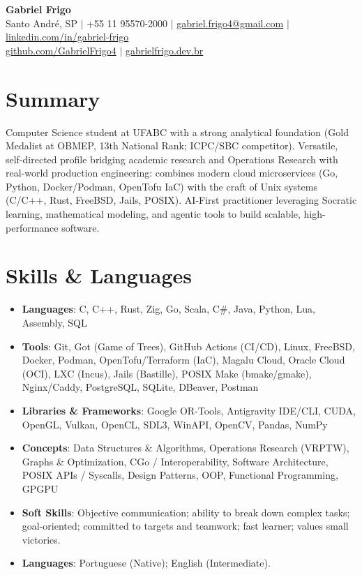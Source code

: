 \documentclass[letterpaper,10pt]{article}
\newcommand{\resumeItem}[1]{\item\small{#1}}
\newcommand{\resumeSubHeadingList}{\begin{itemize}[leftmargin=0.15in, label={}]}
\newcommand{\resumeSubHeadingListEnd}{\end{itemize}}
\begin{document}
\begin{center}
  \textbf{\Huge Gabriel Frigo} \\
  \small Santo André, SP $|$ +55 11 95570-2000 $|$ \href{mailto:gabriel.frigo4@gmail.com}{gabriel.frigo4@gmail.com} $|$
  \href{https://linkedin.com/in/gabriel-frigo-b6727b275/}{linkedin.com/in/gabriel-frigo} \\
  \href{https://github.com/GabrielFrigo4}{github.com/GabrielFrigo4} $|$
  \href{https://gabrielfrigo.dev.br}{gabrielfrigo.dev.br}
\end{center}

\section{Summary}
Computer Science student at UFABC with a strong analytical foundation (Gold Medalist at OBMEP, 13th National Rank; ICPC/SBC competitor). Versatile, self-directed profile bridging academic research and Operations Research with real-world production engineering: combines modern cloud microservices (Go, Python, Docker/Podman, OpenTofu IaC) with the craft of Unix systems (C/C++, Rust, FreeBSD, Jails, POSIX). AI-First practitioner leveraging Socratic learning, mathematical modeling, and agentic tools to build scalable, high-performance software.

\section{Skills \& Languages}
\resumeSubHeadingList
  \resumeItem{\textbf{Languages}: C, C++, Rust, Zig, Go, Scala, C\#, Java, Python, Lua, Assembly, SQL}
  \resumeItem{\textbf{Tools}: Git, Got (Game of Trees), GitHub Actions (CI/CD), Linux, FreeBSD, Docker, Podman, OpenTofu/Terraform (IaC), Magalu Cloud, Oracle Cloud (OCI), LXC (Incus), Jails (Bastille), POSIX Make (bmake/gmake), Nginx/Caddy, PostgreSQL, SQLite, DBeaver, Postman}
  \resumeItem{\textbf{Libraries \& Frameworks}: Google OR-Tools, Antigravity IDE/CLI, CUDA, OpenGL, Vulkan, OpenCL, SDL3, WinAPI, OpenCV, Pandas, NumPy}
  \resumeItem{\textbf{Concepts}: Data Structures \& Algorithms, Operations Research (VRPTW), Graphs \& Optimization, CGo / Interoperability, Software Architecture, POSIX APIs / Syscalls, Design Patterns, OOP, Functional Programming, GPGPU}
  \resumeItem{\textbf{Soft Skills}: Objective communication; ability to break down complex tasks; goal-oriented; committed to targets and teamwork; fast learner; values small victories.}
  \resumeItem{\textbf{Languages}: Portuguese (Native); English (Intermediate).}
\resumeSubHeadingListEnd
\end{document}
